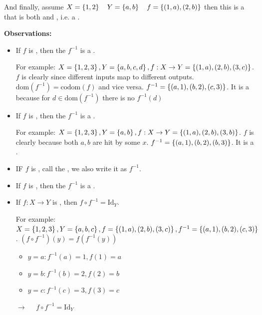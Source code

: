 And finally, assume $X=\left\{1,2\right\} \quad Y=\left\{a,b\right\} \quad f=\left\{(1,a),(2,b)\right\}$ then this is a  that is both  and , i.e. a  .



\textbf{Observations:}
\begin{itemize}
\item If $f$ is , then the   $f^{-1}$ is a .

For example: $X = \left\{1,2,3\right\}, Y = \left\{a,b,c,d\right\}, f:X \to Y = \left\{(1,a),(2,b),(3,c)\right\}$. $f$ is clearly  since different inputs map to different outputs. $\text{dom}(f^{-1}) = \text{codom}(f)$ and vice versa. $f^{-1} = \left\{(a,1),(b,2),(c,3)\right\}$. It is a  because for $d \in \text{dom}(f^{-1})$ there is no $f^{-1} (d)$
\item If $f$ is , then the   $f^{-1}$ is a  . 

For example: $X = \left\{1,2,3\right\}, Y = \left\{a,b\right\}, f:X \to Y = \left\{(1,a),(2,b),(3,b)\right\}$. $f$ is clearly  because both $a,b$ are hit by some $x$. $f^{-1} = \left\{(a,1),(b,2),(b,3)\right\}$. It is a .
\item IF $f$ is , call the   , we also write it as $f^{-1}$.
\item If $f$ is , then the  $f^{-1}$ is a .
\item If $f:X \to Y$ is , then $f \circ f^{-1} = \text{Id}_{Y}$.

For example: $X = \left\{1,2,3\right\}, Y = \left\{a,b,c\right\}, f = \left\{(1,a),(2,b),(3,c)\right\}, f^{-1} = \left\{(a,1),(b,2),(c,3)\right\}$. $(f \circ f^{-1})(y) = f(f^{-1}(y))$
\begin{itemize}
    \item $y = a: f^{-1} (a) = 1, f(1) = a$
    \item $y = b: f^{-1} (b) = 2, f(2) = b$
    \item $y = c: f^{-1} (c) = 3, f(3) = c$
\end{itemize}
$\to \quad$ $f \circ f^{-1} = \text{Id}_{Y}$
\end{itemize}

